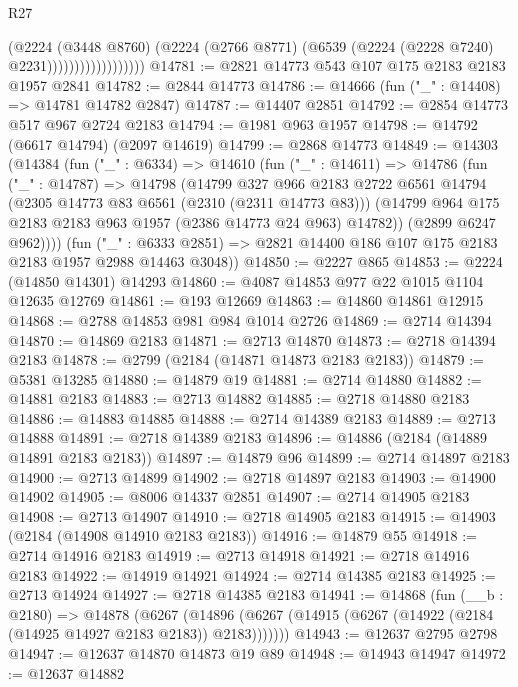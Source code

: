 \begin{lexlean}{R27}
\begin{coremodule}
                                (@2224
                                  (@3448 @8760)
                                  (@2224
                                    (@2766 @8771)
                                    (@6539 (@2224 (@2228 @7240) @2231))))))))))))))))))
@14781 := @2821 @14773 @543 @107 @175 @2183 @2183 @1957 @2841
@14782 := @2844 @14773
@14786 := @14666 (fun ("_" : @14408) => @14781 @14782 @2847)
@14787 := @14407 @2851
@14792 := @2854 @14773 @517 @967 @2724 @2183
@14794 := @1981 @963 @1957
@14798 := @14792 (@6617 @14794) (@2097 @14619)
@14799 := @2868 @14773
@14849 := @14303
    (@14384
      (fun ("_" : @6334) =>
      @14610
        (fun ("_" : @14611) =>
        @14786
          (fun ("_" : @14787) =>
          @14798
            (@14799
              @327
              @966
              @2183
              @2722
              @6561
              @14794
              (@2305 @14773 @83 @6561 (@2310 (@2311 @14773 @83)))
              (@14799 @964 @175 @2183 @2183 @963 @1957 (@2386 @14773 @24 @963) @14782))
            (@2899 @6247 @962))))
      (fun ("_" : @6333 @2851) => @2821 @14400 @186 @107 @175 @2183 @2183 @1957 @2988 @14463 @3048))
@14850 := @2227 @865
@14853 := @2224 (@14850 @14301) @14293
@14860 := @4087 @14853 @977 @22 @1015 @1104 @12635 @12769
@14861 := @193 @12669
@14863 := @14860 @14861 @12915
@14868 := @2788 @14853 @981 @984 @1014 @2726
@14869 := @2714 @14394
@14870 := @14869 @2183
@14871 := @2713 @14870
@14873 := @2718 @14394 @2183
@14878 := @2799 (@2184 (@14871 @14873 @2183 @2183))
@14879 := @5381 @13285
@14880 := @14879 @19
@14881 := @2714 @14880
@14882 := @14881 @2183
@14883 := @2713 @14882
@14885 := @2718 @14880 @2183
@14886 := @14883 @14885
@14888 := @2714 @14389 @2183
@14889 := @2713 @14888
@14891 := @2718 @14389 @2183
@14896 := @14886 (@2184 (@14889 @14891 @2183 @2183))
@14897 := @14879 @96
@14899 := @2714 @14897 @2183
@14900 := @2713 @14899
@14902 := @2718 @14897 @2183
@14903 := @14900 @14902
@14905 := @8006 @14337 @2851
@14907 := @2714 @14905 @2183
@14908 := @2713 @14907
@14910 := @2718 @14905 @2183
@14915 := @14903 (@2184 (@14908 @14910 @2183 @2183))
@14916 := @14879 @55
@14918 := @2714 @14916 @2183
@14919 := @2713 @14918
@14921 := @2718 @14916 @2183
@14922 := @14919 @14921
@14924 := @2714 @14385 @2183
@14925 := @2713 @14924
@14927 := @2718 @14385 @2183
@14941 := @14868
    (fun (__b : @2180) =>
    @14878
      (@6267 (@14896 (@6267 (@14915 (@6267 (@14922 (@2184 (@14925 @14927 @2183 @2183)) @2183)))))))
@14943 := @12637 @2795 @2798
@14947 := @12637 @14870 @14873 @19 @89
@14948 := @14943 @14947
@14972 := @12637
    @14882

\end{coremodule}
\end{lexlean}
